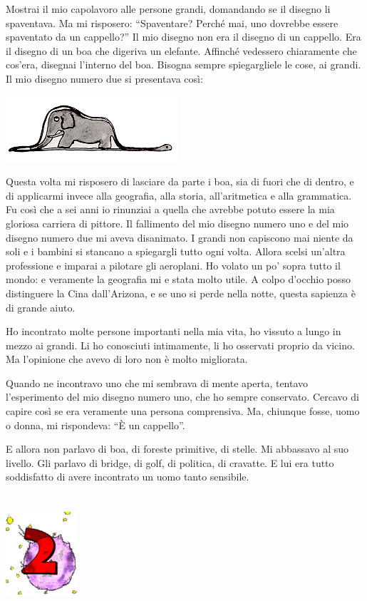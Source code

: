 \documentclass[11pt]{scrbook}
\begin{document}
Mostrai il mio capolavoro alle persone grandi, domandando se il disegno
li spaventava. Ma mi risposero: ``Spaventare? Perché mai, uno dovrebbe
essere spaventato da un cappello?'' Il mio disegno non era il disegno di
un cappello. Era il disegno di un boa che digeriva un elefante. Affinché
vedessero chiaramente che cos'era, disegnai l'interno del boa. Bisogna
sempre spiegargliele le cose, ai grandi. Il mio disegno numero due si
presentava così:

\begin{center}
\includegraphics{img/boa}
\end{center}

Questa volta mi risposero di lasciare da parte i boa, sia di fuori che di dentro, e di applicarmi invece alla geografia, alla storia, all'aritmetica e alla grammatica. Fu così che a sei anni io rinunziai a quella che avrebbe potuto essere la mia gloriosa carriera di pittore. Il fallimento del mio disegno numero uno e del mio disegno numero due mi aveva disanimato. I grandi non capiscono mai niente da soli e i bambini si stancano a spiegargli tutto ogni volta. Allora scelsi un'altra professione e imparai a pilotare gli aeroplani. Ho volato un po' sopra tutto il mondo: e veramente la geografia mi e stata molto utile. A colpo d'occhio posso distinguere la Cina dall'Arizona, e se uno si perde nella notte, questa sapienza è di grande aiuto.

Ho incontrato molte persone importanti nella mia vita, ho vissuto a lungo in mezzo ai grandi. Li ho conosciuti intimamente, li ho osservati proprio da vicino. Ma l'opinione che avevo di loro non è molto migliorata.

Quando ne incontravo uno che mi sembrava di mente aperta, tentavo l'esperimento del mio disegno numero uno, che ho sempre conservato. Cercavo di capire così se era veramente una persona comprensiva. Ma, chiunque fosse, uomo o donna, mi rispondeva: ``È un cappello''.

E allora non parlavo di boa, di foreste primitive, di stelle. Mi abbassavo al suo livello. Gli parlavo di bridge, di golf, di politica, di cravatte. E lui era tutto soddisfatto di avere incontrato un uomo tanto sensibile.

\chapter{}
\begin{center}
\includegraphics{img/chapter2}
\end{center}
\end{document}
